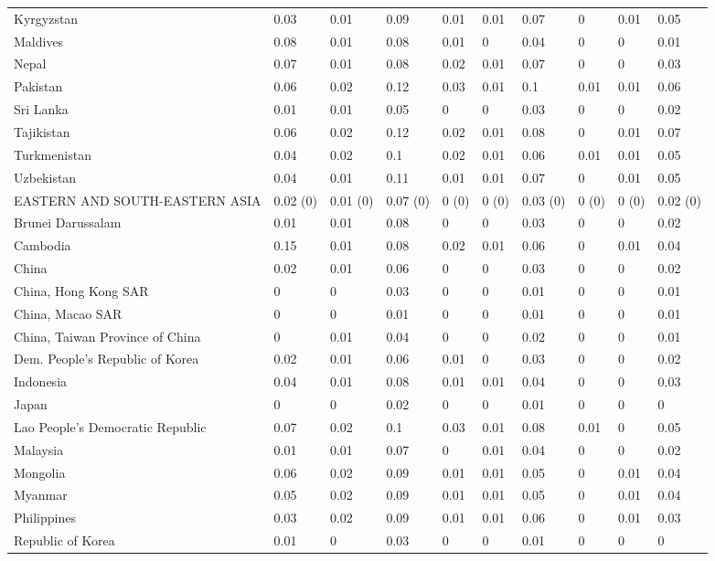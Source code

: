 \begin{longtable}[t]{llllllllll}
Kyrgyzstan & 0.03 & 0.01 & 0.09 & 0.01 & 0.01 & 0.07 & 0 & 0.01 & 0.05\\
Maldives & 0.08 & 0.01 & 0.08 & 0.01 & 0 & 0.04 & 0 & 0 & 0.01\\
Nepal & 0.07 & 0.01 & 0.08 & 0.02 & 0.01 & 0.07 & 0 & 0 & 0.03\\
Pakistan & 0.06 & 0.02 & 0.12 & 0.03 & 0.01 & 0.1 & 0.01 & 0.01 & 0.06\\
Sri Lanka & 0.01 & 0.01 & 0.05 & 0 & 0 & 0.03 & 0 & 0 & 0.02\\
Tajikistan & 0.06 & 0.02 & 0.12 & 0.02 & 0.01 & 0.08 & 0 & 0.01 & 0.07\\
Turkmenistan & 0.04 & 0.02 & 0.1 & 0.02 & 0.01 & 0.06 & 0.01 & 0.01 & 0.05\\
Uzbekistan & 0.04 & 0.01 & 0.11 & 0.01 & 0.01 & 0.07 & 0 & 0.01 & 0.05\\
EASTERN AND SOUTH-EASTERN ASIA & 0.02 (0) & 0.01 (0) & 0.07 (0) & 0 (0) & 0 (0) & 0.03 (0) & 0 (0) & 0 (0) & 0.02 (0)\\
Brunei Darussalam & 0.01 & 0.01 & 0.08 & 0 & 0 & 0.03 & 0 & 0 & 0.02\\
Cambodia & 0.15 & 0.01 & 0.08 & 0.02 & 0.01 & 0.06 & 0 & 0.01 & 0.04\\
China & 0.02 & 0.01 & 0.06 & 0 & 0 & 0.03 & 0 & 0 & 0.02\\
China, Hong Kong SAR & 0 & 0 & 0.03 & 0 & 0 & 0.01 & 0 & 0 & 0.01\\
China, Macao SAR & 0 & 0 & 0.01 & 0 & 0 & 0.01 & 0 & 0 & 0.01\\
China, Taiwan Province of China & 0 & 0.01 & 0.04 & 0 & 0 & 0.02 & 0 & 0 & 0.01\\
Dem. People's Republic of Korea & 0.02 & 0.01 & 0.06 & 0.01 & 0 & 0.03 & 0 & 0 & 0.02\\
Indonesia & 0.04 & 0.01 & 0.08 & 0.01 & 0.01 & 0.04 & 0 & 0 & 0.03\\
Japan & 0 & 0 & 0.02 & 0 & 0 & 0.01 & 0 & 0 & 0\\
Lao People's Democratic Republic & 0.07 & 0.02 & 0.1 & 0.03 & 0.01 & 0.08 & 0.01 & 0 & 0.05\\
Malaysia & 0.01 & 0.01 & 0.07 & 0 & 0.01 & 0.04 & 0 & 0 & 0.02\\
Mongolia & 0.06 & 0.02 & 0.09 & 0.01 & 0.01 & 0.05 & 0 & 0.01 & 0.04\\
Myanmar & 0.05 & 0.02 & 0.09 & 0.01 & 0.01 & 0.05 & 0 & 0.01 & 0.04\\
Philippines & 0.03 & 0.02 & 0.09 & 0.01 & 0.01 & 0.06 & 0 & 0.01 & 0.03\\
Republic of Korea & 0.01 & 0 & 0.03 & 0 & 0 & 0.01 & 0 & 0 & 0\\

\end{longtable}
